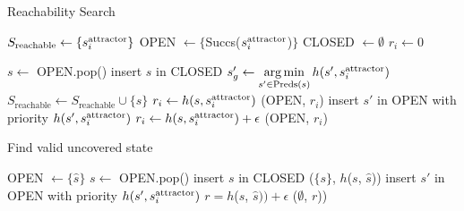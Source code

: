 \documentclass[a4paper,10pt]{article}
\begin{document}
\begin{algorithm}[t]
\footnotesize
\caption{Reachability Search}\label{alg:2}

\begin{algorithmic}[1]
\State $S_{\text{reachable}} \leftarrow \{s^{\text{attractor}}_i\}$  \label{alg:2:reachable}
\State OPEN $\leftarrow \{$Succs($s^{\text{attractor}}_i$)$\}$   \label{alg:2:OPEN}
\State CLOSED $\leftarrow \emptyset$
\State $r_i \leftarrow 0$

    \State $s \leftarrow$ OPEN.pop()
    \State insert $s$ in CLOSED
    \State $s'_g \leftarrow \operatorname*{arg\,min}\limits_{s' \in \text{Preds}(s)} h(s', s^{\text{attractor}}_i)$ 
  \label{alg:2:greedy} 
      \label{alg:2:crit}
        \State $S_{\text{reachable}} \leftarrow S_{\text{reachable}} \cup \{s\}$   \label{alg:2:set}
     \label{alg:2:terminate}
        \State $r_i \leftarrow h(s, s^{\text{attractor}}_i)$ \label{alg:2:rad}
        \State \Return (OPEN, $r_i$)
    \EndIf
     \label{alg:2:prun}
            \State insert $s'$ in OPEN with priority $h(s', s^{\text{attractor}}_i)$
        \EndIf
    \EndFor
\EndWhile
\State $r_i \leftarrow h(s, s^{\text{attractor}}_i) + \epsilon$    
\State \Return (OPEN, $r_i$)

\EndProcedure
\end{algorithmic}
\end{algorithm}

\begin{algorithm}[t]
\footnotesize
\caption{Find valid uncovered state}\label{alg:3b}

\begin{algorithmic}[1]
\State OPEN $\leftarrow \{\hat{s}\}$
  \State $s \leftarrow$ OPEN.pop()
  \State insert $s$ in CLOSED
    \State \Return ($\{s\}$, $h$($s$, $\hat{s}$))
  \EndIf
        \State insert $s'$ in OPEN with priority $h(s', s^{\text{attractor}}_i)$
    \EndIf
  \EndFor
\EndWhile
\State $r = h$($s$, $\hat{s})) + \epsilon$    
\State \Return ($\emptyset$, $r$))
\EndProcedure
\end{algorithmic}
\end{algorithm}
\end{document}
